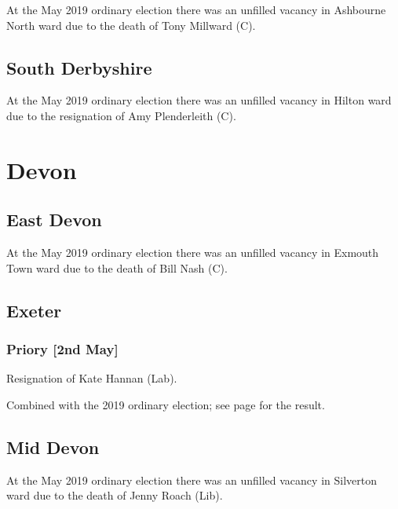 \documentclass[a4paper,openany]{book}
\begin{document}
\begin{resultsiii}
At the May 2019 ordinary election there was an unfilled vacancy in Ashbourne North ward due to the death of Tony Millward (C).

\subsection*{South Derbyshire}

At the May 2019 ordinary election there was an unfilled vacancy in Hilton ward due to the resignation of Amy Plenderleith (C).

\section{Devon}

\subsection*{East Devon}

At the May 2019 ordinary election there was an unfilled vacancy in Exmouth Town ward due to the death of Bill Nash (C).

\subsection*{Exeter}

\subsubsection*{Priory \hspace*{\fill}\nolinebreak[1]%
	\enspace\hspace*{\fill}
	[2nd May]}


Resignation of Kate Hannan (Lab).

Combined with the 2019 ordinary election; see page \pageref{ExeterPriory} for the result.

\subsection*{Mid Devon}

At the May 2019 ordinary election there was an unfilled vacancy in Silverton ward due to the death of Jenny Roach (Lib).


\end{resultsiii}
\end{document}
